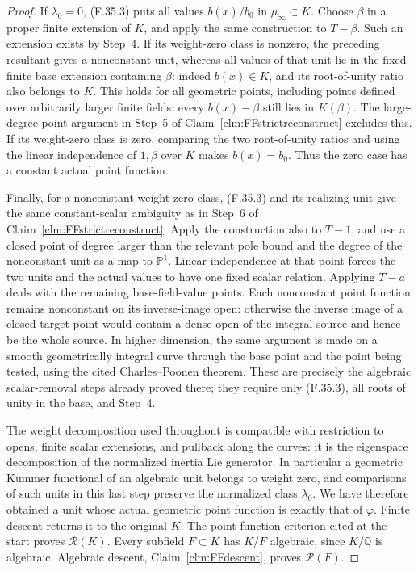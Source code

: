 \documentclass[11pt]{article}
\begin{document}
\begin{proof}
If \(\lambda_0=0\), (F.35.3) puts all
values \(b(x)/b_0\) in \(\mu_\infty\subset K\).
Choose \(\beta\) in a proper finite
extension of \(K\), and apply the same
construction to \(T-\beta\). Such an
extension exists by Step~4. If its
weight-zero class is nonzero, the preceding
resultant gives a nonconstant unit, whereas
all values of that unit lie in the fixed
finite base extension containing \(\beta\):
indeed \(b(x)\in K\), and its root-of-unity
ratio also belongs to \(K\). This holds for
all geometric points, including points defined
over arbitrarily larger finite fields: every
\(b(x)-\beta\) still lies in \(K(\beta)\).
The
large-degree-point argument in Step~5
of Claim~\ref{clm:FFstrictreconstruct}
excludes this. If its weight-zero class
is zero, comparing the two root-of-unity
ratios and using the linear independence
of \(1,\beta\) over \(K\) makes
\(b(x)=b_0\). Thus the zero case has a
constant actual point function.

Finally, for a nonconstant weight-zero
class, (F.35.3) and its realizing unit
give the same constant-scalar ambiguity
as in Step~6 of
Claim~\ref{clm:FFstrictreconstruct}.
Apply the construction also to \(T-1\),
and use a closed point of degree larger
than the relevant pole bound and the
degree of the nonconstant unit as a map
to \(\mathbb P^1\). Linear independence
at that point forces the two units and
the actual values to have one fixed
scalar relation. Applying \(T-a\) deals
with the remaining base-field-value
points. Each nonconstant point function
remains nonconstant on its inverse-image
open: otherwise the inverse image of a
closed target point would contain a dense
open of the integral source and hence
be the whole source. In higher dimension,
the same argument is made on a smooth
geometrically integral curve through the
base point and the point being tested,
using the cited Charles--Poonen theorem.
These are precisely the algebraic
scalar-removal steps already proved there;
they require only (F.35.3), all roots of
unity in the base, and Step~4.

The weight decomposition used throughout
is compatible with restriction to opens,
finite scalar extensions, and pullback
along the curves: it is the eigenspace
decomposition of the normalized inertia
Lie generator. In particular a geometric
Kummer functional of an algebraic unit
belongs to weight zero, and comparisons
of such units in this last step preserve
the normalized class \(\lambda_0\).
We have therefore obtained a unit whose
actual geometric point function is exactly
that of \(\varphi\). Finite descent returns
it to the original \(K\). The point-function
criterion cited at the start proves
\(\mathcal R(K)\).
Every subfield \(F\subset K\) has
\(K/F\) algebraic, since \(K/\mathbb Q\)
is algebraic. Algebraic descent, Claim~\ref{clm:FFdescent},
proves \(\mathcal R(F)\).
\end{proof}
\end{document}
